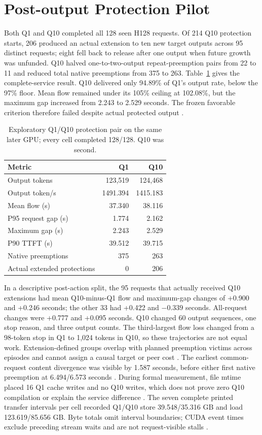 \documentclass[10pt]{article}
\begin{document}
\section{Post-output Protection Pilot}
Both Q1 and Q10 completed all 128 seen H128 requests. Of 214 Q10 protection starts, 206 produced an actual extension to ten new target outputs across 95 distinct requests; eight fell back to release after one output when future growth was unfunded. Q10 halved one-to-two-output repeat-preemption pairs from 22 to 11 and reduced total native preemptions from 375 to 263. Table~\ref{tab:capacityq} gives the complete-service result. Q10 delivered only 94.89\% of Q1's output rate, below the 97\% floor. Mean flow remained under its 105\% ceiling at 102.08\%, but the maximum gap increased from 2.243 to 2.529 seconds. The frozen favorable criterion therefore failed despite actual protected output \cite{capacityq}.

\begin{table}[t]
\centering\small
\caption{Exploratory Q1/Q10 protection pair on the same later GPU; every cell completed 128/128. Q10 was second.}
\label{tab:capacityq}
\begin{tabular}{lrr}
\toprule
Metric & Q1 & Q10 \\
\midrule
Output tokens & 123,519 & 124,468 \\
Output token/s & 1491.394 & 1415.183 \\
Mean flow (s) & 37.340 & 38.116 \\
P95 request gap (s) & 1.774 & 2.162 \\
Maximum gap (s) & 2.243 & 2.529 \\
P90 TTFT (s) & 39.512 & 39.715 \\
Native preemptions & 375 & 263 \\
Actual extended protections & 0 & 206 \\
\bottomrule
\end{tabular}
\end{table}

In a descriptive post-action split, the 95 requests that actually received Q10 extensions had mean Q10-minus-Q1 flow and maximum-gap changes of +0.900 and +0.246 seconds; the other 33 had +0.422 and $-0.339$ seconds. All-request changes were +0.777 and +0.095 seconds. Q10 changed 60 output sequences, one stop reason, and three output counts. The third-largest flow loss changed from a 98-token stop in Q1 to 1,024 tokens in Q10, so these trajectories are not equal work. Extension-defined groups overlap with planned preemption victims across episodes and cannot assign a causal target or peer cost \cite{capacityqpeer}. The earliest common-request content divergence was visible by 1.587 seconds, before either first native preemption at 6.494/6.573 seconds \cite{capacityqexposure}. During formal measurement, file mtime placed 16 Q1 cache writes and no Q10 writes, which does not prove zero Q10 compilation or explain the service difference \cite{capacityq}. The seven complete printed transfer intervals per cell recorded Q1/Q10 store 39.548/35.316 GB and load 123.619/85.656 GB. Byte totals omit interval boundaries; CUDA event times exclude preceding stream waits and are not request-visible stalls \cite{capacityqtransfers}.
\end{document}
